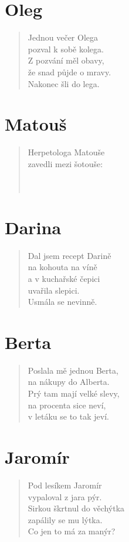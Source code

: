 \section*{Oleg}
\begin{verse}
Jednou večer Olega\\
pozval k sobě kolega.\\
Z pozvání měl obavy,\\
že snad půjde o mravy.\\
Nakonec šli do lega.
\end{verse}

\section*{Matouš}
\begin{verse}
Herpetologa Matouše\\
zavedli mezi šotouše:\\
\\
\\
\end{verse}

\section*{Darina}
\begin{verse}
Dal jsem recept Darině\\
na kohouta na víně\\
a v kuchařské čepici\\
uvařila slepici.\\
Usmála se nevinně.
\end{verse}

\section*{Berta}
\begin{verse}
Poslala mě jednou Berta,\\
na nákupy do Alberta.\\
Prý tam mají velké slevy,\\
na procenta sice neví,\\
v letáku se to tak jeví.
\end{verse}

\section*{Jaromír}
\begin{verse}
Pod lesíkem Jaromír\\
vypaloval z jara pýr.\\
Sirkou škrtnul do věchýtka\\
zapálily se mu lýtka.\\
Co jen to má za manýr?
\end{verse}

